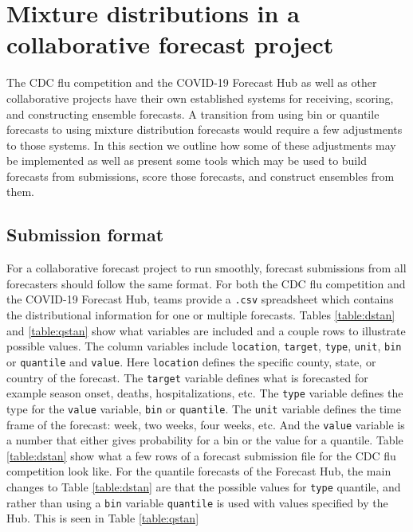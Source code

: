 \documentclass[11pt,notitlepage]{isuthesis}
\begin{document}
\chapter{Mixture distributions in a collaborative forecast project}
\label{section:conmixforc}


The CDC flu competition and the COVID-19 Forecast Hub as well as other 
collaborative projects
have their own established systems for receiving, 
scoring, and constructing ensemble forecasts. A transition from using bin or 
quantile forecasts to using mixture distribution forecasts
would require
a few adjustments to those systems. In this section we outline how some of these
adjustments may be implemented as well as present some tools which may be used
to build forecasts from submissions, score those forecasts, and construct 
ensembles from them.

\section{Submission format}
For a collaborative forecast project to run smoothly, forecast submissions from 
all forecasters 
should follow the same format. For both the CDC flu competition and
the COVID-19 Forecast Hub, teams provide a \texttt{.csv} spreadsheet which 
contains the distributional information for one or multiple forecasts. Tables
\ref{table:dstan} and \ref{table:qstan} show what variables are included and a
couple rows to illustrate possible values.
The column variables include \texttt{location}, \texttt{target}, \texttt{type},
\texttt{unit}, \texttt{bin} or \texttt{quantile} and \texttt{value}.
Here \texttt{location} defines the specific county, state, or country of the 
forecast. The \texttt{target} variable defines what is forecasted for example
season onset, deaths, hospitalizations, etc. The \texttt{type} variable defines
the type for the \texttt{value} variable, \texttt{bin} or \texttt{quantile}.
The \texttt{unit} variable defines the time frame of the forecast: week,
two weeks, four weeks, etc. And the \texttt{value} variable is a number that 
either gives probability for a bin or the value for a quantile. Table
\ref{table:dstan} show what a few rows of a forecast 
submission file for the CDC flu competition look like.
For the quantile forecasts of the Forecast Hub, the main changes to Table
\ref{table:dstan} are that the possible values for \texttt{type} 
quantile, and rather than using a \texttt{bin} variable \texttt{quantile} is 
used
with values specified by the Hub. This is seen in Table \ref{table:qstan}
\end{document}
